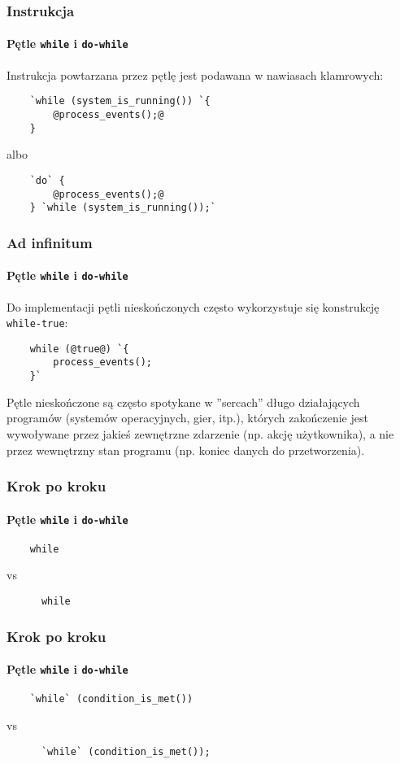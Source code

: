 \documentclass[aspectratio=169]{beamer}
\begin{document}
\begin{frame}[fragile]
    \frametitle{Instrukcja}
    \framesubtitle{Pętle {\tt while} i {\tt do-while}}

    Instrukcja powtarzana przez pętlę jest podawana w nawiasach klamrowych:

    \begin{lstlisting}
    `while (system_is_running()) `{
        @process_events();@
    }
    \end{lstlisting}

    albo

    \begin{lstlisting}
    `do` {
        @process_events();@
    } `while (system_is_running());`
    \end{lstlisting}
\end{frame}

\begin{frame}[fragile]
    \frametitle{Ad infinitum}
    \framesubtitle{Pętle {\tt while} i {\tt do-while}}

    Do implementacji pętli nieskończonych często wykorzystuje się konstrukcję
    {\tt while-true}:

    \begin{lstlisting}
    while (@true@) `{
        process_events();
    }`
    \end{lstlisting}

    Pętle nieskończone są często spotykane w ''sercach'' długo działających
    programów (systemów operacyjnych, gier, itp.), których zakończenie jest
    wywoływane przez jakieś zewnętrzne zdarzenie (np. akcję użytkownika), a nie
    przez wewnętrzny stan programu (np. koniec danych do przetworzenia).
\end{frame}

\begin{frame}[fragile]
    \frametitle{Krok po kroku}
    \framesubtitle{Pętle {\tt while} i {\tt do-while}}

    \begin{lstlisting}
    while
    \end{lstlisting}
    \vspace{2.4em}

    vs

    \vspace{2.4em}
    \begin{lstlisting}
      while
    \end{lstlisting}
\end{frame}

\begin{frame}[fragile]
    \frametitle{Krok po kroku}
    \framesubtitle{Pętle {\tt while} i {\tt do-while}}

    \begin{lstlisting}
    `while` (condition_is_met())
    \end{lstlisting}
    \vspace{2.4em}

    vs

    \vspace{2.4em}
    \begin{lstlisting}
      `while` (condition_is_met());
    \end{lstlisting}
\end{frame}
\end{document}
